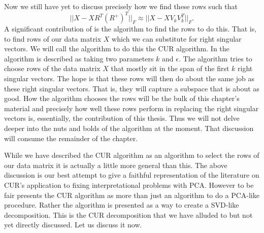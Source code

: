 \documentclass{book}
\begin{document}
Now we still have yet to discuss precisely how we find these rows such that 
$$
||X-XR^T(R^+)^T||_F \approx ||X-XV_kV_k^T||_F.
$$
A significant contribution of \cite{pnas} is the algorithm to find the rows to do this. That is, to find rows of our data matrix $X$ which we can substitute for right singular vectors. We will call the algorithm to do this the CUR algorithm. In \cite{pnas} the algorithm is described as taking two parameters $k$ and $\epsilon$. The algorithm tries to choose rows of the data matrix $X$ that mostly sit in the span of the first $k$ right singular vectors. The hope is that these rows will then do about the same job as these right singular vectors. That is, they will capture a subspace that is about as good. How the algorithm chooses the rows will be the bulk of this chapter's material and precisely how well these rows perform in replacing the right singular vectors is, essentially, the contribution of this thesis. Thus we will not delve deeper into the nuts and bolds of the algorithm at the moment. That discussion will consume the remainder of the chapter.

 While we have described the CUR algorithm as an algorithm to select the rows of our data matrix it is actually a little more general than this. The above discussion is our best attempt to give a faithful representation of the literature on CUR's application to fixing interpretational problems with PCA. However to be fair \cite{pnas} presents the CUR algorithm as more than just an algorithm to do a PCA-like procedure. Rather  the algorithm is presented as a way to create a SVD-like decomposition. This is the CUR decomposition that we have alluded to but not yet directly discussed. Let us discuss it now. 
\end{document}
